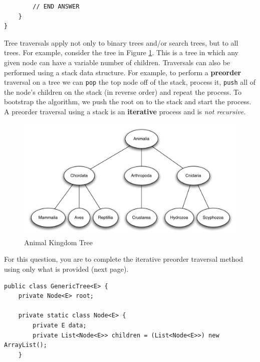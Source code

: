 \documentclass[11pt]{exam}
\begin{document}
\begin{questions}
\begin{verbatim}
	
	
	
	
	
	
	
	
	
	
        // END ANSWER
    }
}
\end{verbatim}

\newpage
\question[20] Tree traversals apply not only to binary trees and/or search trees, but to all trees.  For example, consider the tree in Figure \ref{fig:exampleTree}.   This is a tree in which any given node can have a variable number of children.   Traversals can also be performed using a stack data structure.  For example, to perform a {\bf preorder} traversal on a tree we can {\tt pop} the top node off of the stack, process it, {\tt push} all of the node's children on the stack (in reverse order) and repeat the process.   To bootstrap the algorithm, we push the root on to the stack and start the process.    A preorder traversal using a stack is an {\bf iterative} process and is {\it not recursive.}
\begin{figure}[htbp]
   \begin{center}
      \includegraphics[width=6in]{animals}
   \end{center}
   \caption{Animal Kingdom Tree}
   \label{fig:exampleTree}
\end{figure}

For this question, you are to complete the iterative preorder traversal method using only what is provided (next page).
\newpage

\begin{verbatim}
public class GenericTree<E> {
    private Node<E> root;

    private static class Node<E> {
        private E data;
        private List<Node<E>> children = (List<Node<E>>) new ArrayList();
    }


\end{verbatim}
\end{questions}
\end{document}
